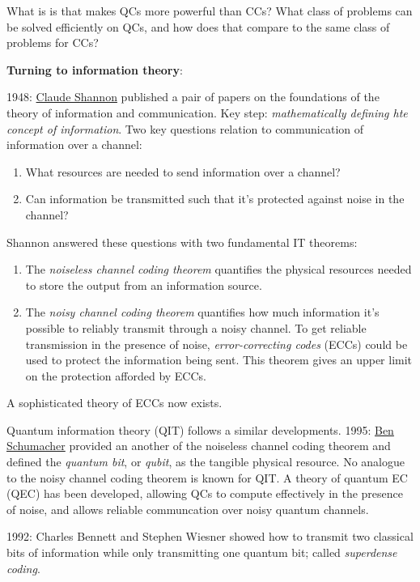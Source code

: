 \documentclass{article}
\numberwithin{equation}{section}
\begin{document}
What is is that makes QCs more powerful than CCs? What class of problems can be solved efficiently on QCs, and how does that compare to the same class of problems for CCs?

\textbf{Turning to information theory}:

1948: \href{https://en.wikipedia.org/wiki/Claude_Shannon}{Claude Shannon} published a pair of papers on the foundations of the theory of information and communication. Key step: \textit{mathematically defining hte concept of information}. Two key questions relation to communication of information over a channel:

\begin{enumerate}
\item What resources are needed to send information over a channel?
\item Can information be transmitted such that it's protected against noise in the channel?
\end{enumerate}

Shannon answered these questions with two fundamental IT theorems:

\begin{enumerate}
\item The \textit{noiseless channel coding theorem} quantifies the physical resources needed to store the output from an information source.
\item The \textit{noisy channel coding theorem} quantifies how much information it's possible to reliably transmit through a noisy channel. To get reliable transmission in the presence of noise, \textit{error-correcting codes} (ECCs) could be used to protect the information being sent. This theorem gives an upper limit on the protection afforded by ECCs.
\end{enumerate}

A sophisticated theory of ECCs now exists.

Quantum information theory (QIT) follows a similar developments. 1995: \href{https://en.wikipedia.org/wiki/Benjamin_Schumacher}{Ben Schumacher} provided an another of the noiseless channel coding theorem and defined the \textit{quantum bit}, or \textit{qubit}, as the tangible physical resource. No analogue to the noisy channel coding theorem is known for QIT. A theory of quantum EC (QEC) has been developed, allowing QCs to compute effectively in the presence of noise, and allows reliable communcation over noisy quantum channels.

1992: Charles Bennett and Stephen Wiesner showed how to transmit two classical bits of information while only transmitting one quantum bit; called \textit{superdense coding}.
\end{document}
